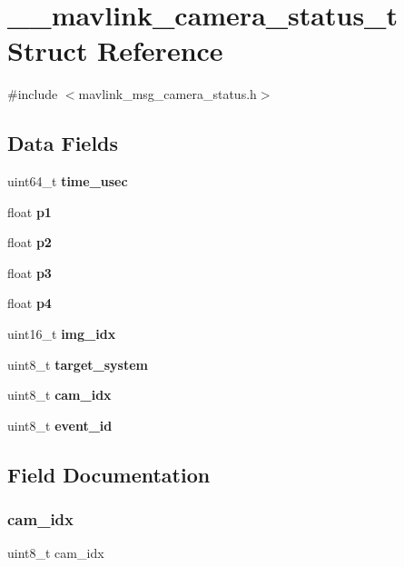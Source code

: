 \section{\+\_\+\+\_\+mavlink\+\_\+camera\+\_\+status\+\_\+t Struct Reference}
\label{struct____mavlink__camera__status__t}


{\ttfamily \#include $<$mavlink\+\_\+msg\+\_\+camera\+\_\+status.\+h$>$}

\subsection*{Data Fields}
\begin{DoxyCompactItemize}
\item 
uint64\+\_\+t \textbf{ time\+\_\+usec}
\item 
float \textbf{ p1}
\item 
float \textbf{ p2}
\item 
float \textbf{ p3}
\item 
float \textbf{ p4}
\item 
uint16\+\_\+t \textbf{ img\+\_\+idx}
\item 
uint8\+\_\+t \textbf{ target\+\_\+system}
\item 
uint8\+\_\+t \textbf{ cam\+\_\+idx}
\item 
uint8\+\_\+t \textbf{ event\+\_\+id}
\end{DoxyCompactItemize}


\subsection{Field Documentation}
\mbox{\label{struct____mavlink__camera__status__t_aaa252c47e167f27ddd98b7da2ccd20bd}} 
\subsubsection{cam\+\_\+idx}
{\footnotesize\ttfamily uint8\+\_\+t cam\+\_\+idx}

\mbox{\label{struct____mavlink__camera__status__t_aee539108cc019b56d4b942795e7f79f8}} 

